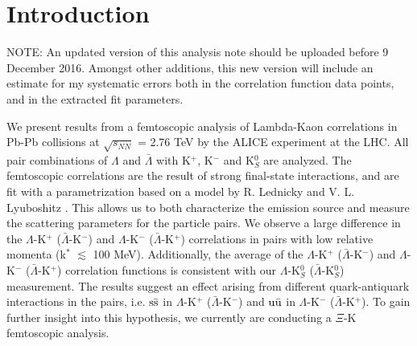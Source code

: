 \documentclass[../AnalysisNoteJBuxton.tex]{subfiles}
\begin{document}
\section{Introduction}

NOTE:  An updated version of this analysis note should be uploaded before 9 December 2016.  Amongst other additions, this new version will include an estimate for my systematic errors both in the correlation function data points, and in the extracted fit parameters.

We present results from a femtoscopic analysis of Lambda-Kaon correlations in Pb-Pb collisions at $\sqrt{s_{NN}}$ = 2.76 TeV by the ALICE experiment at the LHC.  
All pair combinations of $\Lambda$ and $\bar{\Lambda}$ with K$^{+}$, K$^{-}$ and K$^{0}_{S}$ are analyzed.  
The femtoscopic correlations are the result of strong final-state interactions, and are fit with a parametrization based on a model by R. Lednicky and V. L. Lyuboshitz \cite{Lednicky:82}.  
This allows us to both characterize the emission source and measure the scattering parameters for the particle pairs.  
We observe a large difference in the $\Lambda$-K$^{+}$ ($\bar{\Lambda}$-K$^{-}$) and $\Lambda$-K$^{-}$ ($\bar{\Lambda}$-K$^{+}$) correlations in pairs with low relative momenta (k$^{*}$ $\lesssim$ 100 MeV).  
Additionally, the average of the $\Lambda$-K$^{+}$ ($\bar{\Lambda}$-K$^{-}$) and $\Lambda$-K$^{-}$ ($\bar{\Lambda}$-K$^{+}$) correlation functions is consistent with our $\Lambda$-K$^{0}_{S}$ ($\bar{\Lambda}$-K$^{0}_{S}$) measurement.  
The results suggest an effect arising from different quark-antiquark interactions in the pairs, i.e. $\rm s\bar{s}$ in $\Lambda$-K$^{+}$ ($\bar{\Lambda}$-K$^{-}$) and $\rm u\bar{u}$ in $\Lambda$-K$^{-}$ ($\bar{\Lambda}$-K$^{+}$).  
To gain further insight into this hypothesis, we currently are conducting a $\Xi$-K femtoscopic analysis.
\end{document}
